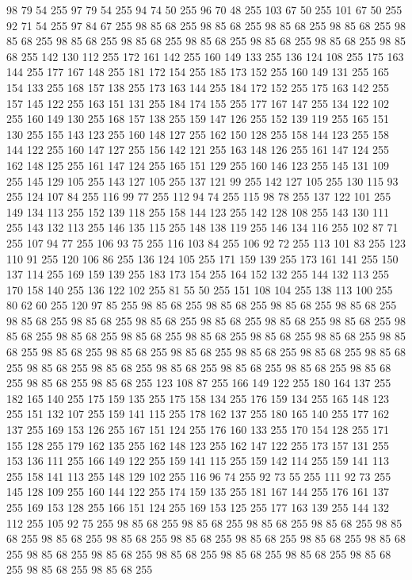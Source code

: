 98 79 54 255 97 79 54 255 94 74 50 255 96 70 48 255 103 67 50 255 101 67 50 255 92 71 54 255 97 84 67 255 98 85 68 255 98 85 68 255 98 85 68 255 98 85 68 255 98 85 68 255 98 85 68 255 98 85 68 255 98 85 68 255 98 85 68 255 98 85 68 255 98 85 68 255 142 130 112 255 172 161 142 255 160 149 133 255 136 124 108 255 175 163 144 255 177 167 148 255 181 172 154 255 185 173 152 255 160 149 131 255 165 154 133 255 168 157 138 255 173 163 144 255 184 172 152 255 175 163 142 255 157 145 122 255 163 151 131 255 184 174 155 255 177 167 147 255 134 122 102 255 160 149 130 255 168 157 138 255 159 147 126 255 152 139 119 255 165 151 130 255 155 143 123 255 160 148 127 255 162 150 128 255 158 144 123 255 158 144 122 255 160 147 127 255 156 142 121 255 163 148 126 255 161 147 124 255 162 148 125 255 161 147 124 255 165 151 129 255 160 146 123 255 145 131 109 255 145 129 105 255 143 127 105 255 137 121 99 255 142 127 105 255 130 115 93 255 124 107 84 255 116 99 77 255
112 94 74 255 115 98 78 255 137 122 101 255 149 134 113 255 152 139 118 255 158 144 123 255 142 128 108 255 143 130 111 255 143 132 113 255 146 135 115 255 148 138 119 255 146 134 116 255 102 87 71 255 107 94 77 255 106 93 75 255 116 103 84 255 106 92 72 255 113 101 83 255 123 110 91 255 120 106 86 255 136 124 105 255 171 159 139 255 173 161 141 255 150 137 114 255 169 159 139 255 183 173 154 255 164 152 132 255 144 132 113 255 170 158 140 255 136 122 102 255 81 55 50 255 151 108 104 255 138 113 100 255 80 62 60 255 120 97 85 255 98 85 68 255 98 85 68 255 98 85 68 255 98 85 68 255 98 85 68 255 98 85 68 255 98 85 68 255 98 85 68 255 98 85 68 255 98 85 68 255 98 85 68 255 98 85 68 255 98 85 68 255 98 85 68 255 98 85 68 255 98 85 68 255 98 85 68 255 98 85 68 255 98 85 68 255 98 85 68 255 98 85 68 255 98 85 68 255 98 85 68 255 98 85 68 255 98 85 68 255 98 85 68 255 98 85 68 255 98 85 68 255 98 85 68 255
98 85 68 255 98 85 68 255 123 108 87 255 166 149 122 255 180 164 137 255 182 165 140 255 175 159 135 255 175 158 134 255 176 159 134 255 165 148 123 255 151 132 107 255 159 141 115 255 178 162 137 255 180 165 140 255 177 162 137 255 169 153 126 255 167 151 124 255 176 160 133 255 170 154 128 255 171 155 128 255 179 162 135 255 162 148 123 255 162 147 122 255 173 157 131 255 153 136 111 255 166 149 122 255 159 141 115 255 159 142 114 255 159 141 113 255 158 141 113 255 148 129 102 255 116 96 74 255 92 73 55 255 111 92 73 255 145 128 109 255 160 144 122 255 174 159 135 255 181 167 144 255 176 161 137 255 169 153 128 255 166 151 124 255 169 153 125 255 177 163 139 255 144 132 112 255 105 92 75 255 98 85 68 255 98 85 68 255 98 85 68 255 98 85 68 255 98 85 68 255 98 85 68 255 98 85 68 255 98 85 68 255 98 85 68 255 98 85 68 255 98 85 68 255 98 85 68 255 98 85 68 255 98 85 68 255 98 85 68 255 98 85 68 255 98 85 68 255 98 85 68 255 98 85 68 255

